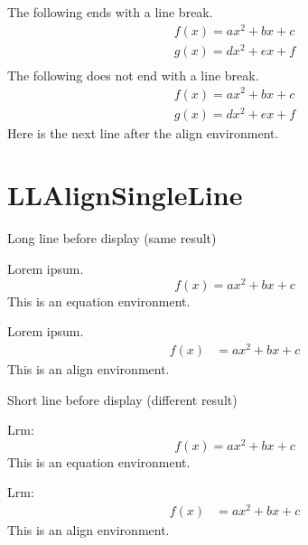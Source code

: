 \documentclass[a4paper]{article}
\newcommand{\tA}[1]{\textcolor{cA}{#1}}
\newcommand{\tD}[1]{\textcolor{cD}{#1}}
\begin{document}
The following ends with a line break.
\begin{gather}
	f(x) = ax^2 + bx + c \\
	g(x) = dx^2 + ex + f \\
\end{gather}
The following does not end with a line break.
\begin{gather}
	f(x) = ax^2 + bx + c \\
	g(x) = dx^2 + ex + f
\end{gather}
Here is the next line after the align environment.

\section{LLAlignSingleLine}

\begin{itembox}{\large Long line before display (same result)}
	\begin{minipage}[t]{.5\columnwidth}
		Lorem ipsum.
		\begin{equation*}
			f(x) = ax^2 + bx + c
		\end{equation*}
		This is an \tA{equation} environment.
	\end{minipage}%
	\begin{minipage}[t]{.5\columnwidth}
		Lorem ipsum.
		\begin{align*}
			f(x) & = ax^2 + bx + c
		\end{align*}
		This is an \tD{align} environment.
	\end{minipage}
\end{itembox}

\vspace{\baselineskip}

\begin{itembox}{\large Short line before display (different result)}
	\begin{minipage}[t]{.5\columnwidth}
		Lrm:
		\begin{equation*}
			f(x) = ax^2 + bx + c
		\end{equation*}
		This is an \tA{equation} environment.
	\end{minipage}%
	\begin{minipage}[t]{.5\columnwidth}
		Lrm:
		\begin{align*}
			f(x) & = ax^2 + bx + c
		\end{align*}
		This is an \tD{align} environment.
	\end{minipage}
\end{itembox}
\end{document}
